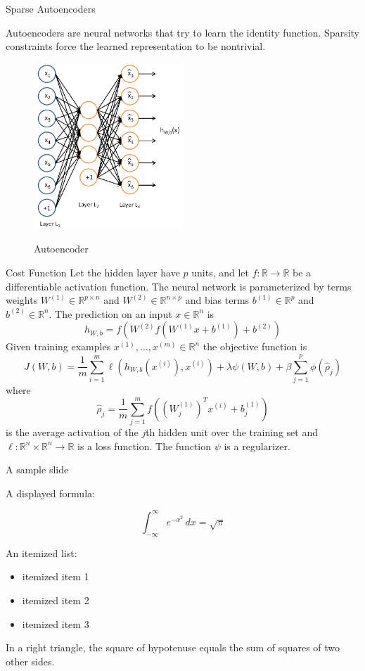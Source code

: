 \documentclass{beamer}
\newcommand{\RR}{\mathbb{R}}
\newcommand{\ra}{\rightarrow}
\newcommand{\Wo}{W^{(1)}}
\newcommand{\Wt}{W^{(2)}}
\newcommand{\bo}{b^{(1)}}
\newcommand{\bt}{b^{(2)}}
\newcommand{\xii}{x^{(i)}}
\begin{document}
\begin{frame}{Sparse Autoencoders}

Autoencoders are neural networks that try to learn the identity function.
Sparsity constraints force the learned representation to be nontrivial.

\begin{figure}[htb]
\begin{center}
\label{proc_sched}
\includegraphics[width=0.5\textwidth]{Autoencoder636.png}
\caption{Autoencoder}
\end{center}
\end{figure}

\end{frame}
\begin{frame}{Cost Function}
\small
Let the hidden layer have $p$ units, and let $f:\RR\ra\RR$ be a differentiable
activation function. The neural network is parameterized by terms weights
$\Wo\in\RR^{p\times n}$ and $\Wt\in\RR^{n\times p}$ and bias terms $\bo\in\RR^p$
and $\bt\in\RR^n$. The prediction on an input
$x\in\RR^n$ is
\[h_{W,b}=f(\Wt f(\Wo x+\bo)+\bt)\]
Given training examples $x^{(1)},\ldots,x^{(m)}\in\RR^n$ the objective function is
\[J(W,b)=\frac1m\sum_{i=1}^m\ell(h_{W,b}(\xii),\xii)+\lambda\psi(W,b)+\beta\sum_{j=1}^p\phi(\hat\rho_j)\]
where 
\[\hat\rho_j=\frac1m\sum_{j=1}^mf\left((\Wo_j)^T\xii+\bo_j\right)\] is 
the average activation of the $j$th hidden unit over the training set and $\ell:\RR^n\times\RR^n\ra\RR$ is a loss function. The function
$\psi$ is a regularizer.
\normalsize
\end{frame}
\begin{frame}{A sample slide}

A displayed formula:

\[
  \int_{-\infty}^\infty e^{-x^2} \, dx = \sqrt{\pi}
  \]

An itemized list:

\begin{itemize}
\item itemized item 1
\item itemized item 2
\item itemized item 3
\end{itemize}

\begin{theorem}
In a right triangle, the square of hypotenuse equals
the sum of squares of two other sides.
\end{theorem}
\end{frame}
\end{document}
